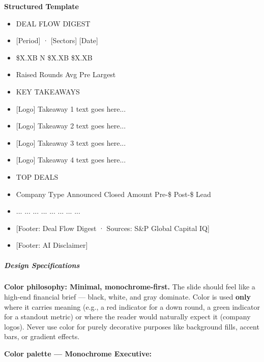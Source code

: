 \documentclass[11pt]{article}
\begin{document}
\textbf{Structured Template}
\begin{itemize}[leftmargin=*,itemsep=2pt,topsep=2pt]
\item {} DEAL FLOW DIGEST
\item {} [Period] · [Sectors] [Date]
\item {} \$X.XB N \$X.XB \$X.XB
\item {} Raised Rounds Avg Pre Largest
\item {} KEY TAKEAWAYS
\item {} [Logo] Takeaway 1 text goes here...
\item {} [Logo] Takeaway 2 text goes here...
\item {} [Logo] Takeaway 3 text goes here...
\item {} [Logo] Takeaway 4 text goes here...
\item {} TOP DEALS
\item {} Company Type Announced Closed Amount Pre-\$ Post-\$ Lead 🔗
\item {} ... ... ... ... ... ... ... ... 🔗
\item {} [Footer: Deal Flow Digest · Sources: S\&P Global Capital IQ]
\item {} [Footer: AI Disclaimer]
\end{itemize}

\subparagraph{Design Specifications}\mbox{}\par

\textbf{Color philosophy: Minimal, monochrome-first.} The slide should feel like a high-end financial brief — black, white, and gray dominate. Color is used \textbf{only} where it carries meaning (e.g., a red indicator for a down round, a green indicator for a standout metric) or where the reader would naturally expect it (company logos). Never use color for purely decorative purposes like background fills, accent bars, or gradient effects.


\textbf{Color palette — Monochrome Executive:}
\end{document}
